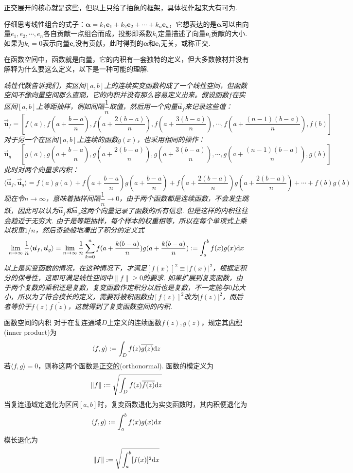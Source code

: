 正交展开的核心就是这些，但以上只给了抽象的框架，具体操作起来大有可为. 

仔细思考线性组合的式子：\(\bm{\alpha} = k_1\bm{e}_1+k_2\bm{e}_2+\cdots+k_n\bm{e}_n\)，它想表达的是\(\bm{\alpha}\)可以由向量\(e_1, e_2, \cdots, e_n\)各自贡献一点组合而成，投影即系数\(k_i\)定量描述了向量\(\bm{e}_i\)贡献的大小. 如果为\(k_i=0\)表示向量\(\bm{e}_i\)没有贡献，此时得到的\(\bm{\alpha}\)和\(\bm{e_i}\)无关，或称正交.

在函数空间中，函数就是向量，它的内积有一套独特的定义，但大多数教材并没有解释为什么要这么定义，以下是一种可能的理解.

\textit{
线性代数告诉我们，实区间\([a,b]\)上的连续实变函数构成了一个线性空间，但函数空间不像向量空间那么直观，它的内积并没有那么容易定义出来。假设函数\(f\)在实区间\([a,b]\)上等距抽样，例如间隔\(\dfrac{1}{n}\)取值，然后用一个向量\(\vec{\bm{u}}_f\)来记录这些值：
\[\vec{\bm{u}}_f = \left[f(a), f(a+\frac{b-a}{n}), f(a+\frac{2(b-a)}{n}), f(a+\frac{3(b-a)}{n}), \cdots, f(a+\frac{(n-1)(b-a)}{n}), f(b)\right]\]
对于另一个在区间\([a,b]\)上连续的函数\(g(x)\)，也采用相同的操作：
\[\vec{\bm{u}}_g = \left[g(a), g(a+\frac{b-a}{n}), g(a+\frac{2(b-a)}{n}), g(a+\frac{3(b-a)}{n}), \cdots, g(a+\frac{(n-1)(b-a)}{n}), g(b)\right]\]
此时对两个向量求内积：
\[\langle\vec{\bm{u}}_f,\vec{\bm{u}}_g\rangle = f(a)g(a)+f(a+\frac{b-a}{n})g(a+\frac{b-a}{n})+f(a+\frac{2(b-a)}{n})g(a+\frac{2(b-a)}{n})+\cdots+f(b)g(b)\]
现在令\(n \to \infty\)，意味着抽样间隔\(\dfrac{1}{n} \to 0\)，由于两个函数都是连续函数，不会发生跳跃，因此可以认为\(\vec{\bm{u}}_f\)和\(\vec{\bm{u}}_g\)这两个向量记录了函数的所有信息. 但是这样的内积往往会趋近于无穷大. 由于是等距抽样，每个样本的权重相等，所以在每个单项式上乘以权重\(1/n\)，然后奇迹般地凑出了积分的定义式
\[\lim_{n \to \infty}\frac{1}{n}\langle\vec{\bm{u}}_f,\vec{\bm{u}}_g\rangle = \lim_{n \to \infty}\frac{1}{n}\sum_{k=0}^{n}f(a+\frac{k(b-a)}{n})g(a+\frac{k(b-a)}{n}) := \int_{a}^{b} f(x)g(x){\rm d}x\]
以上是实变函数的情况，在这种情况下，才满足\([f(x)]^2\equiv|f(x)|^2\)，根据定积分的保号性，这即可满足线性空间中\(\|f\|\geq 0\)的要求. 如果扩展到复变函数，由于两个复数的乘积还是复数，复变函数作定积分以后也是复数，不一定能与\(0\)比大小，所以为了符合模长的定义，需要将被积函数由\([f(z)]^2\)改为\(|f(z)|^2\)，而后者等价于\(f(z)\overline{f(z)}\)，这就得到了复变函数空间的内积.
}
\begin{definition}{函数空间的内积}
    对于在复连通域\(D\)上定义的连续函数\(f(z),g(z)\)，规定其\uline{内积}(inner product)为
    \[ \langle f,g \rangle := \int_{D} f(z)\overline{g(z)}{\rm d}z\]
    若\(\langle f,g \rangle=0\)，则称这两个函数是\uline{正交的}(orthonormal). 函数的模定义为
    \[ \|f\| := \sqrt{\int_{D}f(z)\overline{f(z)}{\rm d}z}\]
    当复连通域定退化为区间\([a,b]\)时，复变函数退化为实变函数时，其内积便退化为
    \[ \langle f,g \rangle := \int_{a}^{b} f(x)g(x){\rm d}x\]
    模长退化为
    \[ \|f\| := \sqrt{\int_{a}^{b}[f(x)]^2{\rm d}x}\]
\end{definition}

